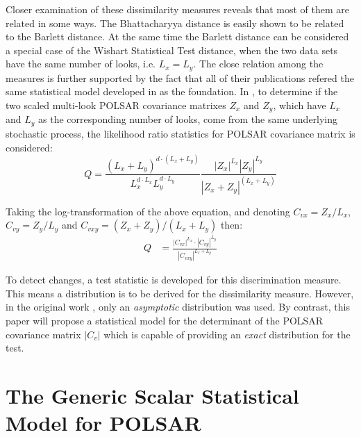 \documentclass[journal]{IEEEtran}
\begin{document}
Closer examination of these dissimilarity measures reveals that most of them are related in some ways. %
The Bhattacharyya distance is easily shown to be related to the Barlett distance.
At the same time the Barlett distance can be considered a special case of the Wishart Statistical Test distance,
  when the two data sets have the same number of looks, i.e. $L_x=L_y$.
The close relation among the measures is further supported by the fact that
  all of their publications refered the same statistical model developed in \cite{Conradsen_2003_TGRS_4} as the foundation.
In \cite{Conradsen_2003_TGRS_4}, to determine if the two scaled multi-look POLSAR covariance matrixes $Z_x$ and $Z_y$,
  which have $L_x$ and $L_y$ as the corresponding number of looks,
  come from the same underlying stochastic process,
the likelihood ratio statistics for POLSAR covariance matrix is considered:  
\begin{equation*}
  Q = \frac{(L_x+L_y)^{d \cdot (L_x+L_y)}}{L_x^{d \cdot L_x} L_y^{d \cdot L_y}} \frac{|Z_x|^{L_x} |Z_y|^{L_y} }{|Z_x+Z_y|^{(L_x+L_y)}}
\end{equation*}

Taking the log-transformation of the above equation, and denoting $C_{vx} = Z_x / L_x$, $C_{vy} = Z_y / L_y$ and $C_{vxy} = (Z_x + Z_y)/(L_x + L_y)$ then:
{\small
\begin{align}
  Q &= \frac{|C_{vx}|^{L_x} \cdot |C_{vy}|^{L_y} }{|C_{vxy}|^{L_x + L_y}} \label{eqn:ori_likelyhood_stats} %
\end{align}
}

To detect changes, a test statistic is developed for this discrimination measure.
This means a distribution is to be derived for the dissimilarity measure.
However, in the original work \cite{Conradsen_2003_TGRS_4}, only an \textit{asymptotic} distribution was used.
By contrast, this paper will propose a statistical model for the determinant of the POLSAR covariance matrix $|C_v|$
  which is capable of providing an \textit{exact} distribution for the test.

\section{The Generic Scalar Statistical Model for POLSAR}  
\label{sec:theoretical_model}
\end{document}
